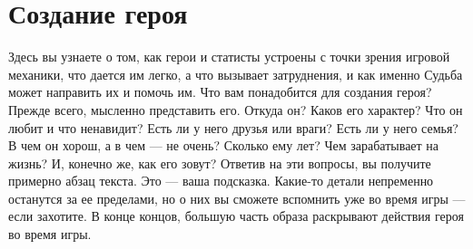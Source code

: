 \chapter{Создание героя}
Здесь вы узнаете о том, как герои и статисты устроены с точки зрения игровой механики, что дается им легко, а что вызывает затруднения, и как именно Судьба может направить их и помочь им. Что вам понадобится для создания героя? Прежде всего, мысленно представить его. Откуда он? Каков его характер? Что он любит и что ненавидит? Есть ли у него друзья или враги? Есть ли у него семья? В чем он хорош, а в чем — не очень? Сколько ему лет? Чем зарабатывает на жизнь? И, конечно же, как его зовут? 
\newline
Ответив на эти вопросы, вы получите примерно абзац текста. Это — ваша подсказка. Какие-то детали непременно останутся за ее пределами, но о них вы сможете вспомнить уже во время игры — если захотите. В конце концов, большую часть образа раскрывают действия героя во время игры.


















